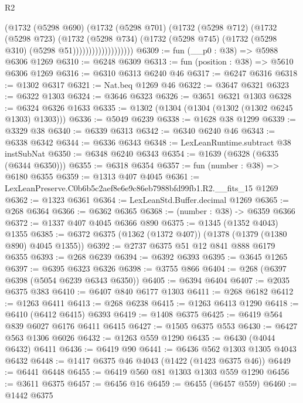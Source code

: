 \begin{lexlean}{R2}
\begin{coremodule}
                          (@1732
                            (@5298 @690)
                            (@1732
                              (@5298 @701)
                              (@1732
                                (@5298 @712)
                                (@1732
                                  (@5298 @723)
                                  (@1732
                                    (@5298 @734)
                                    (@1732
                                      (@5298 @745)
                                      (@1732 (@5298 @310) (@5298 @51)))))))))))))))))))
@6309 := fun (__p0 : @38) => @5988 @6306 @1269
@6310 := @6248 @6309
@6313 := fun (position : @38) => @5610 @6306 @1269
@6316 := @6310 @6313 @6240 @46
@6317 := @6247 @6316
@6318 := @1302 @6317
@6321 := Nat.beq @1269 @46
@6322 := @3647 @6321
@6323 := @6322 @1303
@6324 := @3646 @6323
@6326 := @3651 @6321 @1303
@6328 := @6324 @6326 @1633
@6335 := @1302 (@1304 (@1304 (@1302 (@1302 @6245 @1303) @1303)))
@6336 := @5049 @6239
@6338 := @1628 @38 @1299
@6339 := @3329 @38
@6340 := @6339 @6313
@6342 := @6340 @6240 @46
@6343 := @6338 @6342
@6344 := @6336 @6343
@6348 := LexLeanRuntime.subtract @38 instSubNat
@6350 := @6348 @6240 @6343
@6354 := @1639 (@6328 (@6335 (@6344 @6350)))
@6355 := @6318 @6354
@6357 := fun (number : @38) => @6180 @6355
@6359 := @1313 @407 @4045
@6361 := LexLeanPreserve.C0b6b5c2aef8e6e9c86eb7988bfd99fb1.R2.__fits_15 @1269
@6362 := @1323 @6361
@6364 := LexLeanStd.Buffer.decimal @1269
@6365 := @268 @6364
@6366 := @6362 @6365
@6368 := (number : @38) -> @6359 @6366
@6372 := @1337 @407 @4045 @6366 @890
@6375 := @1345 (@1352 @4043) @1355
@6385 := @6372 @6375 (@1362 (@1372 @407)) (@1378 (@1379 (@1380 @890) @4045 @1355))
@6392 := @2737 @6375 @51 @12 @841 @888 @6179 @6355
@6393 := @268 @6239
@6394 := @6392 @6393
@6395 := @3645 @1265
@6397 := @6395 @6323 @6326
@6398 := @3755 @866
@6404 := @268 (@6397 @6398 (@5054 @6239 @6343 @6350))
@6405 := @6394 @6404
@6407 := @2035 @6375 @383
@6410 := @6407 @840 @6177 @1303
@6411 := @268 @6182
@6412 := @1263 @6411
@6413 := @268 @6238
@6415 := @1263 @6413 @1290
@6418 := @6410 (@6412 @6415) @6393
@6419 := @1408 @6375
@6425 := @6419 @564 @839 @6027 @6176 @6411 @6415
@6427 := @1505 @6375 @553
@6430 := @6427 @563 @1306 @6026
@6432 := @1263 @559 @1290
@6435 := @6430 (@4044 @6432) @6411
@6436 := @6419 @90
@6441 := @6436 @562 @1303 @1305 @4043 @6432
@6448 := @1417 @6375 @46 @4043 (@1422 (@1423 @6375 @46))
@6449 := @6441 @6448
@6455 := @6419 @560 @81 @1303 @1303 @559 @1290
@6456 := @3611 @6375
@6457 := @6456 @16
@6459 := @6455 (@6457 @559)
@6460 := @1442 @6375

\end{coremodule}
\end{lexlean}
